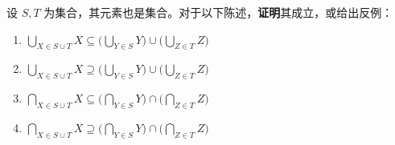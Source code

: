 \begin{exercise}
    设 $S, T$ 为集合，其元素也是集合。对于以下陈述，\textbf{证明}其成立，或给出反例：

    \begin{enumerate}[label=(\alph*)]
        \item $\displaystyle \bigcup_{X \in S \cup T} X \subseteq \Bigg(\bigcup_{Y \in S} Y\Bigg) \cup \Bigg(\bigcup_{Z \in T} Z\Bigg)$
        \item $\displaystyle \bigcup_{X \in S \cup T} X \supseteq \Bigg(\bigcup_{Y \in S} Y\Bigg) \cup \Bigg(\bigcup_{Z \in T} Z\Bigg)$
        \item $\displaystyle \bigcap_{X \in S \cup T} X \subseteq \Bigg(\bigcap_{Y \in S} Y\Bigg) \cap \Bigg(\bigcap_{Z \in T} Z\Bigg)$
        \item $\displaystyle \bigcap_{X \in S \cup T} X \supseteq \Bigg(\bigcap_{Y \in S} Y\Bigg) \cap \Bigg(\bigcap_{Z \in T} Z\Bigg)$
    \end{enumerate} 
\end{exercise}